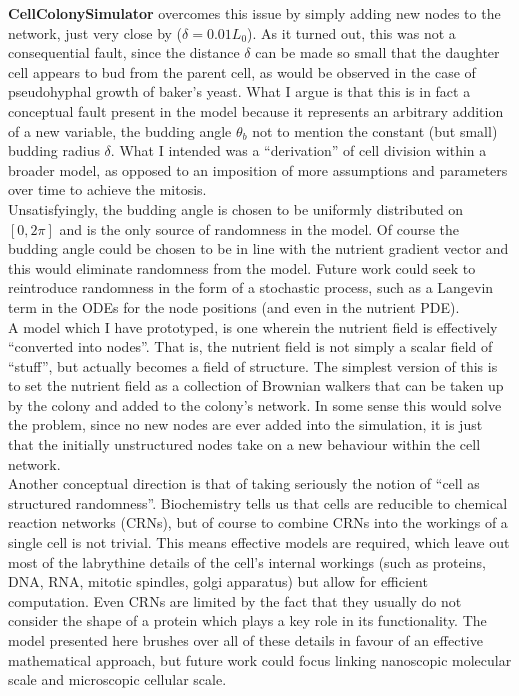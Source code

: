\textbf{CellColonySimulator} overcomes this issue by simply 
adding new nodes to the network, just very close by ($\delta = 0.01 L_0$).
As it turned out, this was not a consequential fault,
since the distance $\delta$ can be made so small that 
the daughter cell appears to bud from the parent cell, as 
would be observed in the case of pseudohyphal growth of baker's yeast.
What I argue is that this is in fact a conceptual fault present in the model
because it represents an arbitrary addition of a new variable,
the budding angle $\theta_{b}$ not to mention the constant (but small) budding radius 
$\delta$. What I intended  
was a ``derivation'' of cell division within a broader model,
as opposed to an imposition of more assumptions and parameters
over time to achieve the mitosis.
\\

Unsatisfyingly, the budding angle is chosen to be uniformly distributed on $[0, 2 \pi]$
and is the only source of randomness in the model. Of course the budding angle
could be chosen to be in line with the nutrient gradient vector and this would 
eliminate randomness from the model. Future work could seek to 
reintroduce randomness in the form of a stochastic process, 
such as a Langevin term in the ODEs for the node positions (and even in the nutrient PDE).
\\

A model which I have prototyped, is one wherein the nutrient field is 
effectively ``converted into nodes''. That is, the nutrient field is not simply
a scalar field of ``stuff'', but actually becomes a field of structure. The simplest
version of this is to set the nutrient field as a collection of Brownian walkers that 
can be taken up by the colony and added to the colony's network. In some sense this 
would solve the problem, since no new nodes are ever added into the simulation,
it is just that the initially unstructured nodes take on a new behaviour within the cell network.
\\

Another conceptual direction is that of taking seriously the notion of 
``cell as structured randomness''. Biochemistry tells us that
cells are reducible to chemical reaction networks (CRNs), but of course to combine 
CRNs into the workings of a single cell is not trivial. This means effective
models are required, which leave out most of the labrythine details of the cell's
internal workings (such as proteins, DNA, RNA, mitotic spindles, golgi apparatus) but allow
for efficient computation. Even CRNs are limited by the fact that 
they usually do not consider the shape of a protein which plays 
a key role in its functionality. The model presented here brushes
over all of these details in favour of an effective mathematical approach, 
but future work could focus linking 
nanoscopic molecular scale and microscopic cellular scale.
\\

